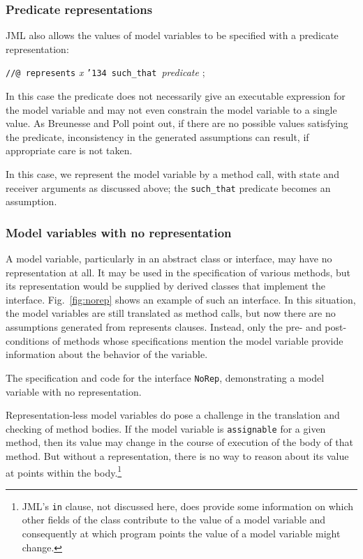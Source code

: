 \documentclass{sig-alternate2}
\begin{document}
\subsubsection{Predicate representations}

JML also allows the values of model variables to be specified with a predicate representation:
\begin{center} \texttt{//@ represents} {\em x} \texttt{\char'134 such\_that }{\em  predicate  } ; \end{center}
In this case the predicate does not necessarily give an executable expression for the
model variable and may not even constrain the model variable to a single value.  As
Breunesse and Poll point out, if there are no possible values satisfying the predicate, 
inconsistency in the generated assumptions can result, if appropriate care is not taken.

In this case, we represent the model variable by a method call, with state and receiver arguments
as discussed above; the \texttt{such\_that} predicate becomes an assumption.

\subsubsection{Model variables with no representation}

A model variable, particularly in an abstract class or interface, may have no representation
at all.  It may be used in the specification of various methods, but its representation would be
supplied by derived classes that implement the interface.  Fig.~\ref{fig:norep}
shows an example of such an interface.  
In this situation, the model variables are still translated as method calls,
but now there are no assumptions generated from represents clauses.  Instead, only the
pre- and post-conditions of methods whose specifications mention the model variable
 provide information about the behavior of the variable.

\begin{BFIGURE}

\caption{The specification and code for the interface \texttt{NoRep},
demonstrating a model variable with no representation.}
\label{fig:norep}
\end{BFIGURE}

Representation-less model variables do pose a challenge in the translation and checking of method bodies.  If the model variable is \texttt{assignable} for a given method, then its value may 
change in the course of execution of the body of that method.  But without a representation,
there is no way to reason about its value at points within the 
body.\footnote{JML's  \texttt{in} clause, not discussed here, does provide some information
on which other fields of the class contribute to the value of a model variable and consequently
at which program points the value of a model variable might change.}
\end{document}
